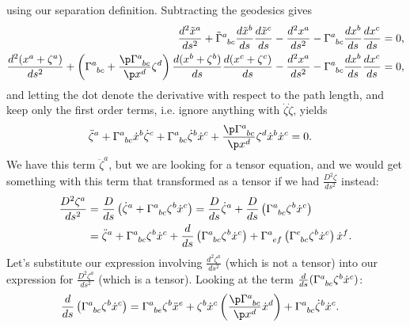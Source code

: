\documentclass[a4paper, 11pt, normalem]{report}
\begin{document}
using our separation definition. 
Subtracting the geodesics gives
\begin{align}
    \frac{d^2\tilde{x}^a}{ds^2} + \tensor{\tilde{\Gamma}}{^a_{bc}}\frac{d\tilde{x}^b}{ds}\frac{d\tilde{x}^c}{ds} - \frac{d^2x^a}{ds^2} - \tensor{\Gamma}{^a_{bc}}\frac{dx^b}{ds}\frac{dx^c}{ds} &= 0, \\
    \frac{d^2(x^a+\zeta^a)}{ds^2} + \left(\tensor{\Gamma}{^a_{bc}} + \frac{\p\tensor{\Gamma}{^a_{bc}}}{\p x^d}\zeta^d\right)\frac{d(x^b+\zeta^b)}{ds}\frac{d(x^c+\zeta^c)}{ds} - \frac{d^2x^a}{ds^2} - \tensor{\Gamma}{^a_{bc}}\frac{dx^b}{ds}\frac{dx^c}{ds} &= 0,
\end{align}
and letting the dot denote the derivative with respect to the path length, and keep only the first order terms, i.e. ignore anything with $\dot{\zeta}\dot{\zeta}$, yields
\begin{align}
    \ddot{\zeta}^a &+ \tensor{\Gamma}{^a_{bc}}\dot{x}^b\dot{\zeta}^c + \tensor{\Gamma}{^a_{bc}}\dot{\zeta}^b\dot{x}^c + \frac{\p\tensor{\Gamma}{^a_{bc}}}{\p x^d} \zeta^d\dot{x}^b\dot{x}^c = 0.
\end{align}
We have this term $\ddot{\zeta}^a$, but we are looking for a tensor equation, and we would get something with this term that transformed as a tensor if we had $\frac{D^2\zeta}{ds^2}$ instead:
\begin{align}
    \begin{split}
        \frac{D^2\zeta^a}{ds^2} &= \frac{D}{ds}\left(\dot{\zeta}^a + \tensor{\Gamma}{^a_{bc}}\zeta^b\dot{x}^c\right) = \frac{D}{ds}\dot{\zeta}^a + \frac{D}{ds}\left(\tensor{\Gamma}{^a_{bc}}\zeta^b\dot{x}^c\right) \\
                                &= \ddot{\zeta}^a + \tensor{\Gamma}{^a_{bc}}\zeta^b\dot{x}^c + \frac{d}{ds}\left(\tensor{\Gamma}{^a_{bc}}\zeta^b\dot{x}^c\right)+\tensor{\Gamma}{^a_{ef}}\left(\tensor{\Gamma}{^e_{bc}}\zeta^b\dot{x}^c\right)\dot{x}^f.
    \end{split}
\end{align}
Let's substitute our expression involving $\frac{d^2\zeta^a}{ds^2}$ (which is not a tensor) into our expression for $\frac{D^2\zeta^a}{ds^2}$ (which is a tensor).
Looking at the term $\frac{d}{ds}(\tensor{\Gamma}{^a_{bc}}\zeta^b\dot{x}^c)$:
\begin{align}
    \frac{d}{ds}\left(\tensor{\Gamma}{^a_{bc}}\zeta^b\dot{x}^c\right) &= \tensor{\Gamma}{^a_{be}}\zeta^b\ddot{x}^e + \zeta^b\dot{x}^c\left(\frac{\p\tensor{\Gamma}{^a_{bc}}}{\p x^d}\dot{x}^d\right) + \tensor{\Gamma}{^a_{bc}}\dot{\zeta}^b\dot{x}^c.
\end{align}
\end{document}
